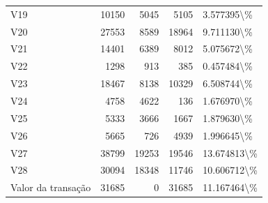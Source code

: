 \begin{longtable}{lrrrl}
V19 & 10150 & 5045 & 5105 & 3.577395\textbackslash \% \\
V20 & 27553 & 8589 & 18964 & 9.711130\textbackslash \% \\
V21 & 14401 & 6389 & 8012 & 5.075672\textbackslash \% \\
V22 & 1298 & 913 & 385 & 0.457484\textbackslash \% \\
V23 & 18467 & 8138 & 10329 & 6.508744\textbackslash \% \\
V24 & 4758 & 4622 & 136 & 1.676970\textbackslash \% \\
V25 & 5333 & 3666 & 1667 & 1.879630\textbackslash \% \\
V26 & 5665 & 726 & 4939 & 1.996645\textbackslash \% \\
V27 & 38799 & 19253 & 19546 & 13.674813\textbackslash \% \\
V28 & 30094 & 18348 & 11746 & 10.606712\textbackslash \% \\
Valor da transação & 31685 & 0 & 31685 & 11.167464\textbackslash \% \\
\end{longtable}
